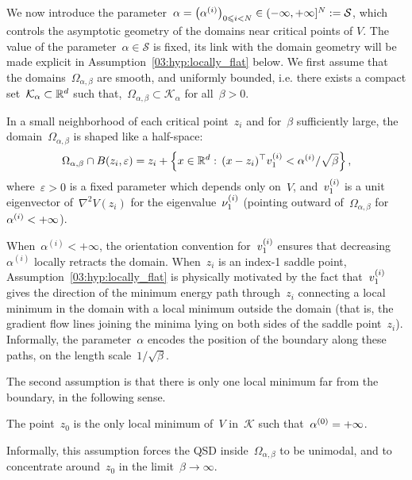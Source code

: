         We now introduce the parameter~$\alpha=\left(\alpha^{(i)}\right)_{0\leqslant i < N}\in(-\infty,+\infty]^N := \mathcal S$, which controls the asymptotic geometry of the domains near critical points of $V$.
        The value of the parameter~$\alpha\in\mathcal S$ is fixed, its link with the domain geometry will be made explicit in Assumption~\ref{03:hyp:locally_flat} below. We first assume that the domains~$\Omega_{\alpha,\beta}$ are smooth, and uniformly bounded, i.e. there exists a compact set~$\mathcal K_\alpha\subset \mathbb{R}^d$ such that,~$\Omega_{\alpha,\beta} \subset \mathcal K_\alpha$ for all~$\beta>0$.
 
        \begin{hypothesis}
            \label{03:hyp:locally_flat}
            In a small neighborhood of each critical point~$z_i$ and for~$\beta$ sufficiently large, the domain~$\Omega_{\alpha,\beta}$ is shaped like a half-space:
            \begin{equation}
                \Omega_{\alpha,\beta} \cap B(z_i,\varepsilon) = z_i + \left\{x\in\mathbb{R}^d:\,(x-z_i)^\top v^{(i)}_{1} < \alpha^{(i)}/\sqrt\beta\right\},
            \end{equation}
            where~$\varepsilon>0$ is a fixed parameter which depends only on~$V$, and~$v^{(i)}_{1}$ is a unit eigenvector of~$\nabla^2 V(z_i)$ for the eigenvalue~$\nu^{(i)}_{1}$ (pointing outward of~$\Omega_{\alpha,\beta}$ for~$\alpha^{(i)}<+\infty$).
            \end{hypothesis}
        When~$\alpha^{(i)}<+\infty$, the orientation convention for~$v^{(i)}_{1}$ ensures that decreasing~$\alpha^{(i)}$ locally retracts the domain.
        When~$z_i$ is an index-1 saddle point, Assumption~\eqref{03:hyp:locally_flat} is physically motivated by the fact that~$v^{(i)}_{1}$ gives the direction of the minimum energy path through~$z_i$ connecting a local minimum in the domain with a local minimum outside the domain (that is, the gradient flow lines joining the minima lying on both sides of the saddle point~$z_i$). Informally, the parameter~$\alpha$ encodes the position of the boundary along these paths, on the length scale~$1/\sqrt\beta$.
        
        The second assumption is that there is only one local minimum far from the boundary, in the following sense.
        \begin{hypothesis}
            \label{03:hyp:one_min}
            The point~$z_0$ is the only local minimum of~$V$ in~$\mathcal K$ such that~$\alpha^{(0)} = +\infty$.
        \end{hypothesis}
        Informally, this assumption forces the QSD inside~$\Omega_{\alpha,\beta}$ to be unimodal, and to concentrate around~$z_0$ in the limit~$\beta\to\infty$.
            
